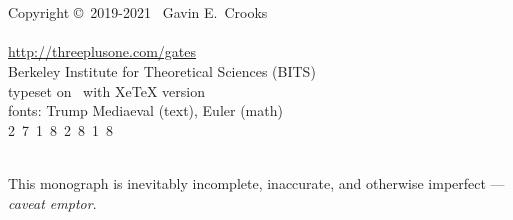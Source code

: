 

~
\vfill
{\center
~\\~\\
Copyright \copyright~2019-2021~ Gavin E.\ Crooks~\\
~ %
\\
\url{http://threeplusone.com/gates} 
\\
Berkeley Institute for Theoretical Sciences (BITS)
\\
typeset on \isotoday~with XeTeX version \the\XeTeXversion\XeTeXrevision
\\
fonts: Trump Mediaeval (text), Euler (math)
\\
  2~7~1~8~2~8~1~8
\\
~ 
\\
}

This monograph is inevitably incomplete, inaccurate, and otherwise imperfect --- \emph{caveat emptor}.
